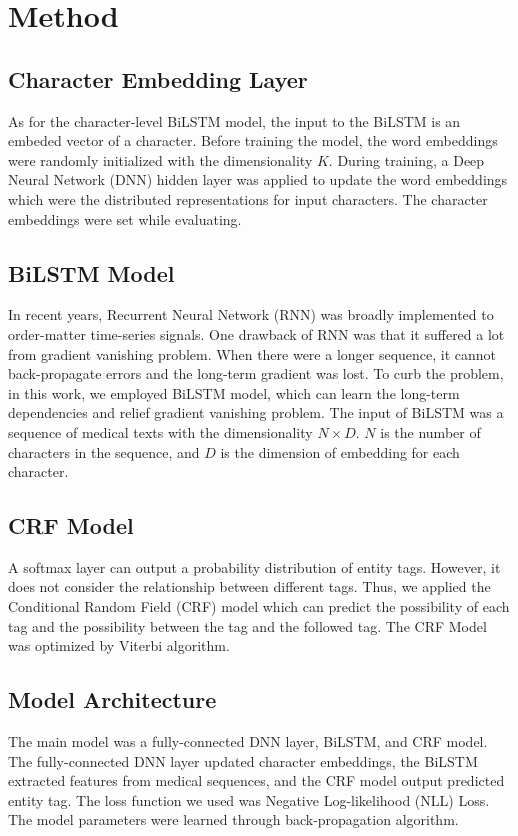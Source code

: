 \documentclass{article}
\begin{document}
\section{Method}
\subsection{Character Embedding Layer}
As for the character-level BiLSTM model, the input to the BiLSTM is an embeded vector of a character. Before training the model, the word embeddings were randomly initialized with the dimensionality $K$. During training, a Deep Neural Network (DNN) hidden layer was applied to update the word embeddings which were the distributed representations for input characters. The character embeddings were set while evaluating.

\subsection{BiLSTM Model}
In recent years, Recurrent Neural Network (RNN)\cite{rumelhart1985learning} was broadly implemented to order-matter time-series signals\cite{hou2020deep}. One drawback of RNN was that it suffered a lot from gradient vanishing problem\cite{pascanu2013difficulty}. When there were a longer sequence, it cannot back-propagate errors and the long-term gradient was lost. To curb the problem, in this work, we employed BiLSTM model, which can learn the long-term dependencies and relief gradient vanishing problem. The input of BiLSTM was a sequence of medical texts with the dimensionality $N \times D$. $N$ is the number of characters in the sequence, and $D$ is the dimension of embedding for each character.

\subsection{CRF Model}
A softmax layer can output a probability distribution of entity tags. However, it does not consider the relationship between different tags. Thus, we applied the Conditional Random Field (CRF) model which can predict the possibility of each tag and the possibility between the tag and the followed tag. The CRF Model was optimized by Viterbi algorithm\cite{lample2016neural}.

\subsection{Model Architecture}
The main model was a fully-connected DNN layer, BiLSTM, and CRF model\cite{li2020survey}. The fully-connected DNN layer updated character embeddings, the BiLSTM extracted features from medical sequences, and the CRF model output predicted entity tag. The loss function we used was Negative Log-likelihood (NLL) Loss. The model parameters were learned through back-propagation algorithm.
\end{document}
